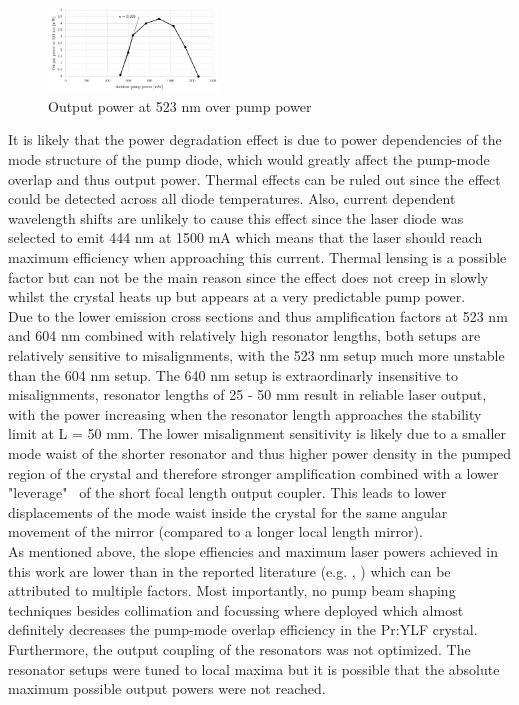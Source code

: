 \documentclass[conference]{IEEEtran}
\begin{document}
\begin{figure}[h]
	\centering
	\includegraphics[width=0.4\textwidth]{img/measurement523}
	\caption{Output power at 523 nm over pump power}
	\label{result523}
\end{figure}
It is likely that the power degradation effect is due to power dependencies of the mode structure of the pump diode, which would greatly affect the pump-mode overlap and thus output power. Thermal effects can be ruled out since the effect could be detected across all diode temperatures. Also, current dependent wavelength shifts are unlikely to cause this effect since the laser diode was selected to emit 444 nm at 1500 mA which means that the laser should reach maximum efficiency when approaching this current. Thermal lensing is a possible factor but can not be the main reason since the effect does not creep in slowly whilst the crystal heats up but appears at a very predictable pump power. \\
Due to the lower emission cross sections and thus amplification factors at 523 nm and 604 nm combined with relatively high resonator lengths, both setups are relatively sensitive to misalignments, with the 523 nm setup much more unstable than the 604 nm setup. The 640 nm setup is extraordinarly insensitive to misalignments, resonator lengths of 25 - 50 mm result in reliable laser output, with the power increasing when the resonator length approaches the stability limit at L = 50 mm. The lower misalignment sensitivity is likely due to a smaller mode waist of the shorter resonator and thus higher power density in the pumped region of the crystal and therefore stronger amplification combined with a lower "leverage" \ of the short focal length output coupler. This leads to lower displacements of the mode waist inside the crystal for the same angular movement of the mirror (compared to a longer local length mirror).\\
As mentioned above, the slope effiencies and maximum laser powers achieved in this work are lower than in the reported literature (e.g. \cite{Richter.2007}, \cite{Luo.2016}) which can be attributed to multiple factors. Most importantly, no pump beam shaping techniques besides collimation and focussing where deployed which almost definitely decreases the pump-mode overlap efficiency in the Pr:YLF crystal. Furthermore, the output coupling of the resonators was not optimized. The resonator setups were tuned to local maxima but it is possible that the absolute maximum possible output powers were not reached.
\end{document}
